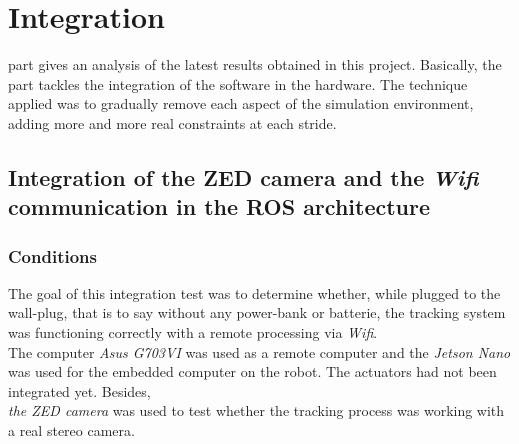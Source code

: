 \chapter{Integration}\label{results}
	
	 part gives an analysis of the latest results
	obtained in this project. Basically, the part tackles
	the integration of the software in the hardware. The technique 
	applied was to gradually remove each aspect of the simulation 
	environment, adding more and more real constraints at each stride.
	
	\begin{comment}
	
		> Integration of the zed camera in the ROS architecture + powered via the wall plug + wifi.
			5 FPS
		
		> With the wifi stick + in real conditions : shutdown --> power and driver problem.
		
		> Ethernet cable : Results of the integration of the hardware with the software:
		test with the remote architecture and the Ethernet cable
			5 FPS in average
			curve of the error
			several pictures showing that the robot follows the target
			
		> Test with the new wifi stick + the processing on the robot.
	
	\end{comment}
	
	\section{Integration of the ZED camera and the \textit{Wifi} communication in the ROS architecture}\label{test1}
		
		\subsection{Conditions}
		
		The goal of this integration test was to determine whether, while plugged 
		to the wall-plug, that is to say without any power-bank or 
		batterie, the tracking system was functioning correctly
		with a remote processing via \textit{Wifi}.
		\\\indent The computer \textit{Asus G703VI} was used
		as a remote computer and the \textit{Jetson Nano} was 
		used for the embedded computer on the robot. The
		actuators had not been integrated yet. Besides,\\
		\textit{the ZED camera} was used to 
		test whether the tracking process was working 
		with a real stereo camera.
		
